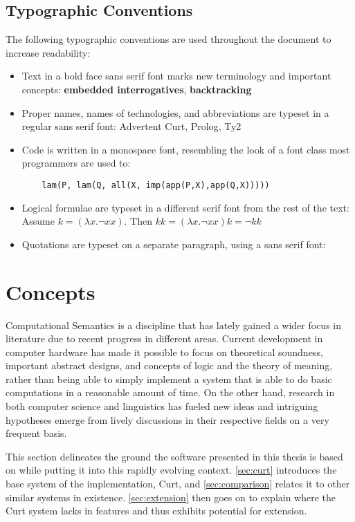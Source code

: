 \documentclass[notitlepage,twoside,a4paper]{scrreprt}
\newcommand{\term}[1]{\textsf{\textbf{#1}}} %
\newcommand{\pn}{\textsf} %
\newcommand{\quotesf}[1]{\quote{\textsf{#1}}}
\newcommand{\curt}{\pn{Curt}}
\newcommand{\acurt}{\pn{Advertent Curt}}
\newcommand{\prol}{\pn{Prolog}}
\theoremstyle{remark}
\theoremstyle{remark}
\theoremstyle{definition}
\theoremstyle{definition}
\begin{document}
\subsection{Typographic Conventions}

The following typographic conventions are used throughout the document to
increase readability:

\begin{itemize}
  \item Text in a bold face sans serif font marks new terminology and important
  concepts: \term{embedded interrogatives}, \term{backtracking}
  \item Proper names, names of technologies, and abbreviations are typeset in a
  regular sans serif font: \acurt, \prol, \pn{Ty2}
  \item Code is written in a monospace font, resembling the look of a font class most
  programmers are used to:
  \begin{lstlisting}
    lam(P, lam(Q, all(X, imp(app(P,X),app(Q,X)))))
  \end{lstlisting}
  \item Logical formulae are typeset in a different serif font from the rest of
  the text:\\
    Assume $k = (\lambda x.\neg xx)$. Then $ kk = (\lambda x .\neg xx)k = \neg kk$
  \item Quotations  are typeset on a separate paragraph, using a sans serif font:
  \quotesf{This answers the question!}
\end{itemize}


\section{Concepts}\label{sec:concepts}

Computational Semantics is a discipline that has  lately gained a wider focus in
literature due to recent progress in different areas.  Current development in
computer hardware has made it possible to focus on theoretical soundness,
important abstract designs, and concepts of logic and the theory of meaning,
rather than being able to simply implement a system that is able to do basic
computations in a reasonable amount of time. On the other hand, research in both
computer science and linguistics has fueled new ideas and intriguing hypotheses
emerge from lively discussions in their respective fields on a very frequent
basis.

This section delineates the ground the software presented in this thesis is
based on while putting it into this rapidly evolving context. \ref{sec:curt}
introduces the base system of the implementation, \curt{}, and
\ref{sec:comparison} relates it to other similar systems in existence.
\ref{sec:extension} then goes on to explain where the \curt{} system lacks in
features and thus exhibits potential for extension.
\end{document}
